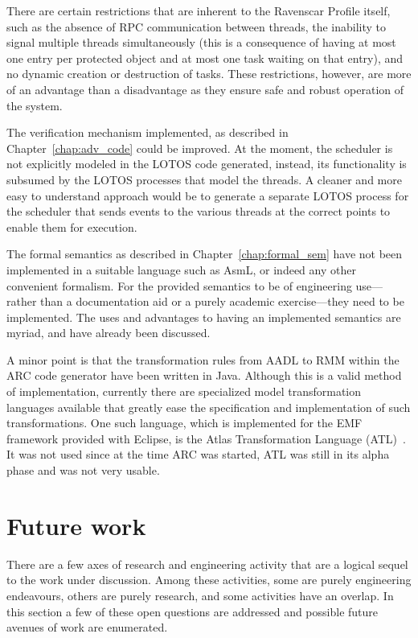 There are certain restrictions that are inherent to the Ravenscar
Profile itself, such as the absence of RPC communication between
threads, the inability to signal multiple threads simultaneously (this
is a consequence of having at most one entry per protected object and
at most one task waiting on that entry), and no dynamic creation or
destruction of tasks. These restrictions, however, are more of an
advantage than a disadvantage as they ensure safe and robust operation
of the system.

The verification mechanism implemented, as described in
Chapter~\ref{chap:adv_code} could be improved. At the moment, the
scheduler is not explicitly modeled in the LOTOS code generated,
instead, its functionality is subsumed by the LOTOS processes that
model the threads. A cleaner and more easy to understand approach
would be to generate a separate LOTOS process for the scheduler that
sends events to the various threads at the correct points to enable
them for execution.

The formal semantics as described in Chapter~\ref{chap:formal_sem}
have not been implemented in a suitable language such as AsmL, or
indeed any other convenient formalism. For the provided semantics to
be of engineering use---rather than a documentation aid or a purely
academic exercise---they need to be implemented. The uses and
advantages to having an implemented semantics are myriad, and have
already been discussed.

A minor point is that the transformation rules from AADL to RMM within
the ARC code generator have been written in Java. Although this is a
valid method of implementation, currently there are specialized model
transformation languages available that greatly ease the specification
and implementation of such transformations. One such language, which
is implemented for the EMF framework provided with Eclipse, is the
Atlas Transformation Language (ATL)~\cite{jouault@oopsla06}. It was
not used since at the time ARC was started, ATL was still in its alpha
phase and was not very usable.

\section{Future work}
There are a few axes of research and engineering activity that are a
logical sequel to the work under discussion. Among these activities,
some are purely engineering endeavours, others are purely research,
and some activities have an overlap. In this section a few of these
open questions are addressed and possible future avenues of work are
enumerated.

